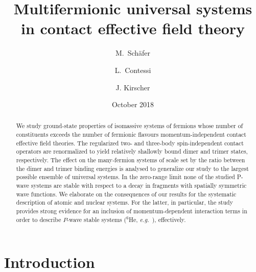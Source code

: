 \documentclass[preprint,12pt]{elsarticle}
\newcommand{\eg}{\textit{e.g.}~}
\begin{document}
\title{Multifermionic universal systems in contact effective field theory}
\author{M.~Sch{\"a}fer }%
\address{Czech Technical University in Prague, Faculty of Nuclear Sciences 
and Physical Engineering, B\v{r}ehov\'{a} 7, 11519 Prague 1, Czech Republic} 
\author{L.~Contessi } 
\address{Racah Institute of Physics, The Hebrew university, 91904 Jerusalem, 
Israel} 
\address{ESNT, IRFU, CEA, Universite Paris Saclay, F-91191 Gif-sur-Yvette, France} 
\author{J. Kirscher }%
\address{Theoretical Physics Division, School of Physics and Astronomy,
The University of Manchester, Manchester, M13 9PL, United Kingdom} 
\date{October 2018}


\begin{abstract}We study ground-state properties of isomassive systems of fermions
whose number of constituents exceeds  the number of fermionic flavours
momentum-independent contact effective field theories.
The regularized two- and three-body spin-independent contact operators are
renormalized to yield relatively shallowly bound dimer and trimer states, respectively.
The effect on the many-fermion systems of scale set by the ratio between the dimer
and trimer binding energies is analysed to generalize our study to the largest
possible ensemble of universal systems.
In the zero-range limit none of the studied P-wave systems are stable with respect to
a decay in fragments with spatially symmetric wave functions.
We elaborate on the consequences of our results for the systematic description of
atomic and nuclear systems. For the latter, in particular, the study provides
strong evidence for an inclusion of momentum-dependent interaction terms in order
to describe $P$-wave stable systems ($^6$He, \eg), effectively.
\end{abstract}

\maketitle



\newpage
\section{Introduction}
\end{document}
